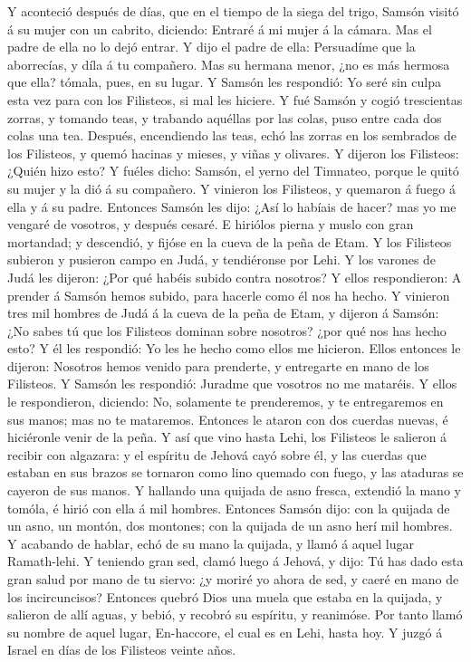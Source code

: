 Y aconteció después de días, que en el tiempo de la siega
del trigo, Samsón visitó á su mujer con un cabrito, diciendo: Entraré á
mi mujer á la cámara. Mas el padre de ella no lo dejó entrar.
 Y dijo el padre de ella: Persuadíme que la aborrecías, y
díla á tu compañero. Mas su hermana menor, ¿no es más hermosa que ella?
tómala, pues, en su lugar.  Y Samsón les respondió: Yo
seré sin culpa esta vez para con los Filisteos, si mal les hiciere.
 Y fué Samsón y cogió trescientas zorras, y tomando teas,
y trabando aquéllas por las colas, puso entre cada dos colas una tea.
 Después, encendiendo las teas, echó las zorras en los
sembrados de los Filisteos, y quemó hacinas y mieses, y viñas y
olivares.  Y dijeron los Filisteos: ¿Quién hizo esto? Y
fuéles dicho: Samsón, el yerno del Timnateo, porque le quitó su mujer y
la dió á su compañero. Y vinieron los Filisteos, y quemaron á fuego á
ella y á su padre.  Entonces Samsón les dijo: ¿Así lo
habíais de hacer? mas yo me vengaré de vosotros, y después cesaré.
 E hiriólos pierna y muslo con gran mortandad; y
descendió, y fijóse en la cueva de la peña de Etam.  Y los
Filisteos subieron y pusieron campo en Judá, y tendiéronse por Lehi.
 Y los varones de Judá les dijeron: ¿Por qué habéis
subido contra nosotros? Y ellos respondieron: A prender á Samsón hemos
subido, para hacerle como él nos ha hecho.  Y vinieron
tres mil hombres de Judá á la cueva de la peña de Etam, y dijeron á
Samsón: ¿No sabes tú que los Filisteos dominan sobre nosotros? ¿por qué
nos has hecho esto? Y él les respondió: Yo les he hecho como ellos me
hicieron.  Ellos entonces le dijeron: Nosotros hemos
venido para prenderte, y entregarte en mano de los Filisteos. Y Samsón
les respondió: Juradme que vosotros no me mataréis.  Y
ellos le respondieron, diciendo: No, solamente te prenderemos, y te
entregaremos en sus manos; mas no te mataremos. Entonces le ataron con
dos cuerdas nuevas, é hiciéronle venir de la peña.  Y así
que vino hasta Lehi, los Filisteos le salieron á recibir con algazara: y
el espíritu de Jehová cayó sobre él, y las cuerdas que estaban en sus
brazos se tornaron como lino quemado con fuego, y las ataduras se
cayeron de sus manos.  Y hallando una quijada de asno
fresca, extendió la mano y tomóla, é hirió con ella á mil hombres.
 Entonces Samsón dijo: con la quijada de un asno, un
montón, dos montones; con la quijada de un asno herí mil hombres.
 Y acabando de hablar, echó de su mano la quijada, y
llamó á aquel lugar Ramath-lehi.  Y teniendo gran sed,
clamó luego á Jehová, y dijo: Tú has dado esta gran salud por mano de tu
siervo: ¿y moriré yo ahora de sed, y caeré en mano de los incircuncisos?
 Entonces quebró Dios una muela que estaba en la quijada,
y salieron de allí aguas, y bebió, y recobró su espíritu, y reanimóse.
Por tanto llamó su nombre de aquel lugar, En-haccore, el cual es en
Lehi, hasta hoy.  Y juzgó á Israel en días de los
Filisteos veinte años.

